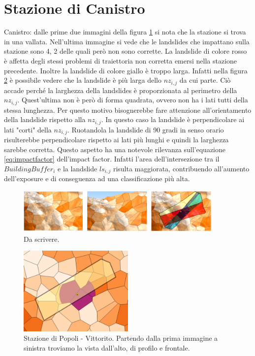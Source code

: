 \section{Stazione di Canistro}
 Canistro: dalle prime due immagini della figura \ref{Canistro_Final} si nota che la stazione si trova in una vallata. Nell'ultima immagine si vede che le landslides che impattano sulla stazione sono 4, 2 delle quali però non sono corrette. La landslide di colore rosso è affetta degli stessi problemi di traiettoria non corretta emersi nella stazione precedente. Inoltre la landslide di colore giallo è troppo larga. Infatti nella figura \ref{WrongPerimeter} è possibile vedere che la landslide è più larga dello $nz_{i,j}$ da cui parte. Ciò accade perché la larghezza della landslides è proporzionata al perimetro della $nz_{i,j}$. Quest'ultima non è però di forma quadrata, ovvero non ha i lati tutti della stessa lunghezza. Per questo motivo bisognerebbe fare attenzione all'orientamento della landslide rispetto alla $nz_{i,j}$. In questo caso la landslide è  perpendicolare ai lati "corti" della $nz_{i,j}$. Ruotandola la landslide di 90 gradi in senso orario risulterebbe perpendicolare rispetto ai lati più lunghi e quindi la larghezza sarebbe corretta.  Questo aspetto ha una notevole rilevanza sull'equazione \ref{eq:impactfactor} dell'impact factor. Infatti l'area dell'intersezione tra il $BuildingBuffer_i$ e la landslide $ls_{i,j}$ risulta maggiorata, contribuendo all'aumento dell'exposure e di conseguenza ad una classificazione più alta.
	
	\begin{figure}[h]
		\centering
		\includegraphics[width=0.9\textwidth]{images/CanistroFinal}
		\caption{Da scrivere.}
		\label{Canistro_Final}
	\end{figure}
	
	
	\begin{figure}[h]
		\centering
		\includegraphics[width=0.5\textwidth]{images/WrongPerimeter}
		\caption{Stazione di Popoli - Vittorito. Partendo dalla prima immagine a sinistra  troviamo la vista dall'alto, di profilo e frontale.}
		\label{WrongPerimeter}
	\end{figure}
	
